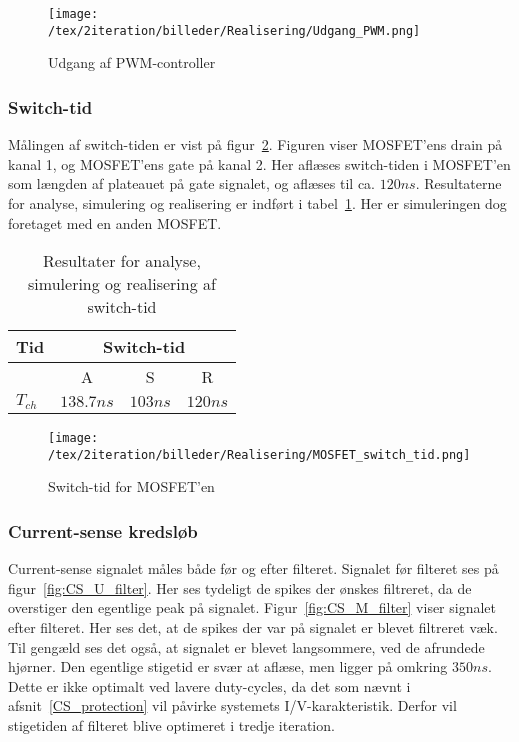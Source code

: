 \begin{figure}[H]
	\center
	\texttt{[image: /tex/2iteration/billeder/Realisering/Udgang\_PWM.png]}
	\caption{Udgang af PWM-controller}
	\label{fig:Udgang_PWM}
\end{figure} 

\subsubsection{Switch-tid}
\noindent Målingen af switch-tiden er vist på figur~\ref{fig:Realisering_MOSFET_switch_tid_2}. Figuren viser MOSFET'ens drain på kanal 1, og MOSFET'ens gate på kanal 2. Her aflæses switch-tiden i MOSFET'en som længden af plateauet på gate signalet, og aflæses til ca. $120ns$. Resultaterne for analyse, simulering og realisering er indført i tabel~\ref{tab:resultat_switch_tid_2}. Her er simuleringen dog foretaget med en anden MOSFET.

\begin{table}[H] 			
	\centering
	\begin{tabularx}{\textwidth}{|X|c|c|c|}
		\hline
		\textbf{Tid} & \multicolumn{3}{|c|}{\textbf{Switch-tid}} 										\\ \hline
		& A & S & R 									\\ \hline
		$T_{ch}$ & $138.7ns$ & $103ns$ & $120ns$ 									\\ \hline 
		
	\end{tabularx}
	\caption{Resultater for analyse, simulering og realisering af switch-tid}
	\label{tab:resultat_switch_tid_2}
\end{table}

 
\begin{figure}[H]
	\center
	\texttt{[image: /tex/2iteration/billeder/Realisering/MOSFET\_switch\_tid.png]}
	\caption{Switch-tid for MOSFET'en}
	\label{fig:Realisering_MOSFET_switch_tid_2}
\end{figure} 


\subsubsection{Current-sense kredsløb}
\noindent Current-sense signalet måles både før og efter filteret. Signalet før filteret ses på figur~\ref{fig:CS_U_filter}. Her ses tydeligt de spikes der ønskes filtreret, da de overstiger den egentlige peak på signalet. Figur~\ref{fig:CS_M_filter} viser signalet efter filteret. Her ses det, at de spikes der var på signalet er blevet filtreret væk. Til gengæld ses det også, at signalet er blevet langsommere, ved de afrundede hjørner. Den egentlige stigetid er svær at aflæse, men ligger på omkring $350ns$. Dette er ikke optimalt ved lavere duty-cycles, da det som nævnt i afsnit~\ref{CS_protection} vil påvirke systemets I/V-karakteristik. Derfor vil stigetiden af filteret blive optimeret i tredje iteration.

